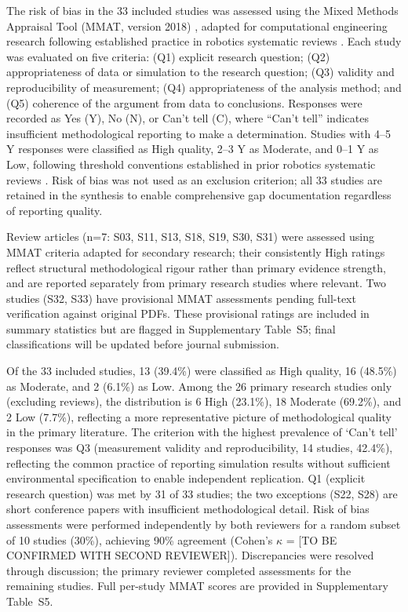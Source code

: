 \documentclass[review,3p,times]{elsarticle}
\begin{document}
The risk of bias in the 33 included studies was assessed using the Mixed Methods Appraisal Tool (MMAT, version 2018) \cite{hong2018}, adapted for computational engineering research following established practice in robotics systematic reviews \cite{brambilla2013}. Each study was evaluated on five criteria: (Q1) explicit research question; (Q2) appropriateness of data or simulation to the research question; (Q3) validity and reproducibility of measurement; (Q4) appropriateness of the analysis method; and (Q5) coherence of the argument from data to conclusions. Responses were recorded as Yes (Y), No (N), or Can't tell (C), where ``Can't tell'' indicates insufficient methodological reporting to make a determination. Studies with 4--5 Y responses were classified as High quality, 2--3 Y as Moderate, and 0--1 Y as Low, following threshold conventions established in prior robotics systematic reviews \cite{brambilla2013,bayindir2016}. Risk of bias was not used as an exclusion criterion; all 33 studies are retained in the synthesis to enable comprehensive gap documentation regardless of reporting quality.

Review articles (n=7: S03, S11, S13, S18, S19, S30, S31) were assessed using MMAT criteria adapted for secondary research; their consistently High ratings reflect structural methodological rigour rather than primary evidence strength, and are reported separately from primary research studies where relevant. Two studies (S32, S33) have provisional MMAT assessments pending full-text verification against original PDFs. These provisional ratings are included in summary statistics but are flagged in Supplementary Table~S5; final classifications will be updated before journal submission.

Of the 33 included studies, 13 (39.4\%) were classified as High quality, 16 (48.5\%) as Moderate, and 2 (6.1\%) as Low. Among the 26 primary research studies only (excluding reviews), the distribution is 6 High (23.1\%), 18 Moderate (69.2\%), and 2 Low (7.7\%), reflecting a more representative picture of methodological quality in the primary literature. The criterion with the highest prevalence of `Can't tell' responses was Q3 (measurement validity and reproducibility, 14 studies, 42.4\%), reflecting the common practice of reporting simulation results without sufficient environmental specification to enable independent replication. Q1 (explicit research question) was met by 31 of 33 studies; the two exceptions (S22, S28) are short conference papers with insufficient methodological detail. Risk of bias assessments were performed independently by both reviewers for a random subset of 10 studies (30\%), achieving 90\% agreement (Cohen's $\kappa$ = [TO BE CONFIRMED WITH SECOND REVIEWER]). Discrepancies were resolved through discussion; the primary reviewer completed assessments for the remaining studies. Full per-study MMAT scores are provided in Supplementary Table~S5.
\end{document}
